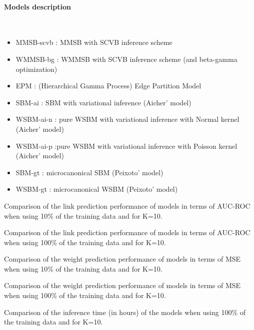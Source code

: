 \documentclass{article}
\begin{document}
\paragraph{Models description}~\\

\begin{itemize}
\item MMSB-scvb : MMSB with SCVB inference scheme
\item WMMSB-bg : WMMSB with SCVB inference scheme (and beta-gamma optimization)
\item EPM : (Hierarchical Gamma Process) Edge Partition Model
\item SBM-ai : SBM with variational inference (Aicher' model)
\item WSBM-ai-n : pure WSBM with variational inference with Normal kernel (Aicher' model)
\item WSBM-ai-p :pure WSBM with variational inference with Poisson kernel (Aicher' model)
\item SBM-gt : microcanonical SBM (Peixoto' model)
\item WSBM-gt : microcanonical WSBM (Peixoto' model)
\end{itemize}


\begin{table}
\caption{Comparison of the link prediction performance of models in terms of AUC-ROC when using 10\% of the training data and for K=10.}
\resizebox{1\textwidth}{!}{ 

}
\end{table}

\begin{table}
\caption{Comparison of the link prediction performance of models in terms of AUC-ROC when using 100\% of the training data and for K=10.}
\resizebox{1\textwidth}{!}{ 

}
\end{table}

\begin{table}
\caption{Comparison of the weight prediction performance of models in terms of MSE when using 10\% of the training data and for K=10.}
\resizebox{1\textwidth}{!}{ 

}
\end{table}

\begin{table}
\caption{Comparison of the weight prediction performance of models in terms of MSE when using 100\% of the training data and for K=10.}
\resizebox{1\textwidth}{!}{ 

}
\end{table}

\begin{table}
\caption{Comparison of the inference time (in hours) of the models when using 100\% of the training data and for K=10.}
\resizebox{1\textwidth}{!}{ 

}
\end{table}
\end{document}
